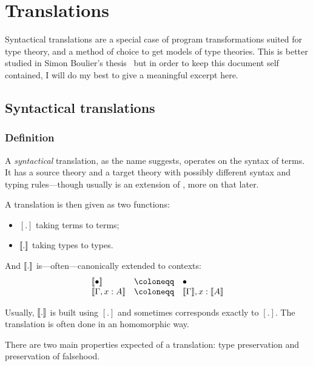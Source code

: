 \chapter{Translations}

Syntactical translations are a special case of program transformations suited
for type theory, and a method of choice to get models of type theories.
This is better studied in Simon Boulier's
thesis~
but in order to keep this document self contained, I will do my best to give a
meaningful excerpt here.

\section{Syntactical translations}

\subsection{Definition}

A \emph{syntactical} translation, as the name suggests, operates on the syntax
of terms. It has a source theory \cS and a target theory \cT with possibly
different syntax and typing rules---though usually \cS is an extension of \cT,
more on that later.

A translation is then given as two functions:
\begin{itemize}
  \item \([.]\) taking \cS terms to \cT terms;
  \item \(\llbracket . \rrbracket\) taking \cS types to \cT types.
\end{itemize}
And \(\llbracket . \rrbracket\) is---often---canonically extended to contexts:
\[
\begin{array}{lcl}
  \transl{\ctxempty} &\coloneqq& \ctxempty \\
  \transl{\Ga, x : A} &\coloneqq& \transl{\Ga}, x : \transl{A}
\end{array}
\]

Usually, \(\llbracket . \rrbracket\) is built using \([.]\) and sometimes corresponds
exactly to \([.]\).
The translation is often done in an homomorphic way.

There are two main properties expected of a translation: type preservation
and preservation of falsehood.

